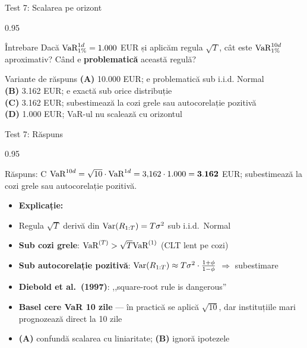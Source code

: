 \documentclass[9pt, aspectratio=169, t]{beamer}
\begin{document}
\begin{frame}[shrink=10]{Test 7: Scalarea pe orizont}
\begin{cminipage}{0.95\textwidth}
    \begin{alertblock}{Întrebare}
    Dacă $\text{VaR}^{1d}_{1\%} = 1.000$ EUR și aplicăm regula $\sqrt{T}$, cât este $\text{VaR}^{10d}_{1\%}$ aproximativ? Când e \textbf{problematică} această regulă?
    \end{alertblock}
    \vspace{0.4cm}
    \begin{block}{Variante de răspuns}
    \textcolor{MainBlue}{\textbf{(A)}} 10.000 EUR; e problematică sub i.i.d. Normal \\[3pt]
    \textcolor{MainBlue}{\textbf{(B)}} 3.162 EUR; e exactă sub orice distribuție \\[3pt]
    \textcolor{MainBlue}{\textbf{(C)}} 3.162 EUR; subestimează la cozi grele sau autocorelație pozitivă \\[3pt]
    \textcolor{MainBlue}{\textbf{(D)}} 1.000 EUR; VaR-ul nu scalează cu orizontul
    \end{block}
\end{cminipage}
\end{frame}

\begin{frame}[shrink=10]{Test 7: Răspuns}
\begin{cminipage}{0.95\textwidth}
    \begin{exampleblock}{Răspuns: C}
    $\text{VaR}^{10d} = \sqrt{10} \cdot \text{VaR}^{1d} = 3{,}162 \cdot 1.000 = \mathbf{3.162}$ EUR; subestimează la cozi grele sau autocorelație pozitivă.
    \end{exampleblock}
    \vspace{0.2cm}
    \begin{itemize}\setlength{\itemsep}{0pt}
        \item \textbf{Explicație:}
        \item Regula $\sqrt{T}$ derivă din $\text{Var}(R_{1:T}) = T \sigma^2$ sub i.i.d.\ Normal
        \item \textbf{Sub cozi grele}: $\text{VaR}^{(T)} > \sqrt{T} \text{VaR}^{(1)}$ (CLT lent pe cozi)
        \item \textbf{Sub autocorelație pozitivă}: $\text{Var}(R_{1:T}) \approx T \sigma^2 \cdot \frac{1+\phi}{1-\phi}$ $\Rightarrow$ subestimare
        \item \textbf{Diebold et al.\ (1997)}: ,,square-root rule is dangerous''
        \item \textbf{Basel cere VaR 10 zile} --- în practică se aplică $\sqrt{10}$, dar instituțiile mari prognozează direct la 10 zile
        \item \textbf{(A)} confundă scalarea cu liniaritate; \textbf{(B)} ignoră ipotezele
    \end{itemize}
\end{cminipage}
\end{frame}
\end{document}
